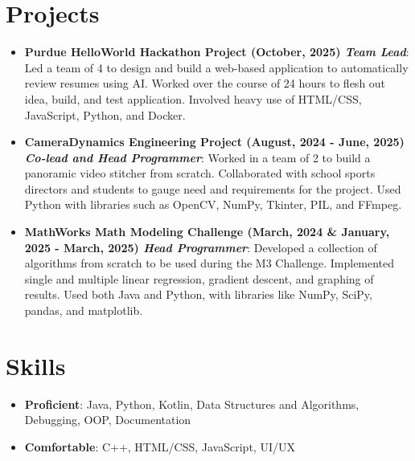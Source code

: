 \documentclass[letterpaper,11pt]{article}
\newcommand{\resumeItem}[2]{
	\item\small{
		\textbf{#1}{: #2 \vspace{-2pt}}
	}
}
\newcommand{\resumeSubItem}[2]{\resumeItem{#1}{#2}\vspace{-4pt}}
\newcommand{\resumeSubHeadingListStart}{\begin{itemize}[leftmargin=*]}
\newcommand{\resumeSubHeadingListEnd}{\end{itemize}}
\begin{document}
	\section{Projects}
	\resumeSubHeadingListStart
	\resumeSubItem{Purdue HelloWorld Hackathon Project (October, 2025) \textit{Team Lead}}
	{Led a team of 4 to design and build a web-based application to automatically review resumes using AI. Worked over the course of 24 hours to flesh out idea, build, and test application. Involved heavy use of HTML/CSS, JavaScript, Python, and Docker.}
	\resumeSubItem{CameraDynamics Engineering Project (August, 2024 - June, 2025) \textit{Co-lead and Head Programmer}}
	{Worked in a team of 2 to build a panoramic video stitcher from scratch. Collaborated with school sports directors and students to gauge need and requirements for the project. Used Python with libraries such as OpenCV, NumPy, Tkinter, PIL, and FFmpeg.}
	\resumeSubItem{MathWorks Math Modeling Challenge (March, 2024 \& January, 2025 - March, 2025) \textit{Head Programmer}}
	{Developed a collection of algorithms from scratch to be used during the M3 Challenge. Implemented single and multiple linear regression, gradient descent, and graphing of results. Used both Java and Python, with libraries like NumPy, SciPy, pandas, and matplotlib.}
	\resumeSubHeadingListEnd
	
	
	\section{Skills}
	\resumeSubHeadingListStart
	\item{
		\textbf{Proficient}{: Java, Python, Kotlin, Data Structures and Algorithms, Debugging, OOP, Documentation}
	}
	\item{
		\textbf{Comfortable}{: C++, HTML/CSS, JavaScript, UI/UX}
	}
	\resumeSubHeadingListEnd
	
	
\end{document}
